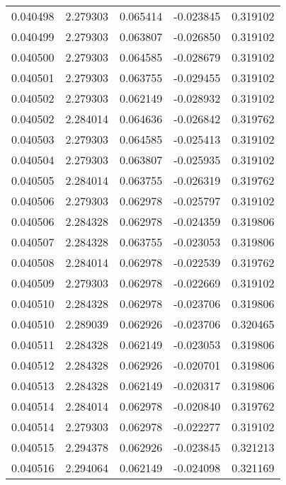 \begin{tabular}{lrrrr}
0.040498    &  2.279303 &  0.065414 & -0.023845 &             0.319102 \\
0.040499    &  2.279303 &  0.063807 & -0.026850 &             0.319102 \\
0.040500    &  2.279303 &  0.064585 & -0.028679 &             0.319102 \\
0.040501    &  2.279303 &  0.063755 & -0.029455 &             0.319102 \\
0.040502    &  2.279303 &  0.062149 & -0.028932 &             0.319102 \\
0.040502    &  2.284014 &  0.064636 & -0.026842 &             0.319762 \\
0.040503    &  2.279303 &  0.064585 & -0.025413 &             0.319102 \\
0.040504    &  2.279303 &  0.063807 & -0.025935 &             0.319102 \\
0.040505    &  2.284014 &  0.063755 & -0.026319 &             0.319762 \\
0.040506    &  2.279303 &  0.062978 & -0.025797 &             0.319102 \\
0.040506    &  2.284328 &  0.062978 & -0.024359 &             0.319806 \\
0.040507    &  2.284328 &  0.063755 & -0.023053 &             0.319806 \\
0.040508    &  2.284014 &  0.062978 & -0.022539 &             0.319762 \\
0.040509    &  2.279303 &  0.062978 & -0.022669 &             0.319102 \\
0.040510    &  2.284328 &  0.062978 & -0.023706 &             0.319806 \\
0.040510    &  2.289039 &  0.062926 & -0.023706 &             0.320465 \\
0.040511    &  2.284328 &  0.062149 & -0.023053 &             0.319806 \\
0.040512    &  2.284328 &  0.062926 & -0.020701 &             0.319806 \\
0.040513    &  2.284328 &  0.062149 & -0.020317 &             0.319806 \\
0.040514    &  2.284014 &  0.062978 & -0.020840 &             0.319762 \\
0.040514    &  2.279303 &  0.062978 & -0.022277 &             0.319102 \\
0.040515    &  2.294378 &  0.062926 & -0.023845 &             0.321213 \\
0.040516    &  2.294064 &  0.062149 & -0.024098 &             0.321169 \\

\end{tabular}
